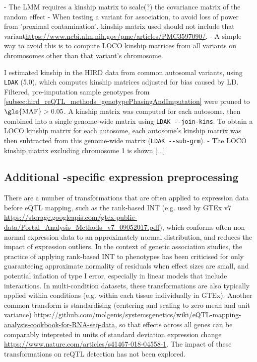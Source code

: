 - The LMM requires a kinship matrix to scale(?) the covariance matrix of the random effect
- When testing a variant for association, to avoid loss of power from 'proximal contamination', kinship matrix used should not include that variant\url{https://www.ncbi.nlm.nih.gov/pmc/articles/PMC3597090/}.
- A simple way to avoid this is to compute \gls{LOCO} kinship matrices from all variants on chromosomes other than that variant's chromosome\autocite{lippert2011FaSTLinearMixed}.

I estimated kinship in the \gls{HIRD} data from common autosomal variants, using \texttt{LDAK} (5.0), which computes kinship matrices adjusted for bias caused by \gls{LD}\autocite{speed2012ImprovedHeritabilityEstimation}.
Filtered, pre-imputation sample genotypes from \autoref{subsec:hird_reQTL_methods_genotypePhasingAndImputation} were pruned to $\text{\gls{MAF}} > 0.05$.
A kinship matrix was computed for each autosome, then combined into a single genome-wide matrix using \texttt{LDAK -{}-join-kins}.
To obtain a \gls{LOCO} kinship matrix for each autosome, each autosome's kinship matrix was then subtracted from this genome-wide matrix (\texttt{LDAK -{}-sub-grm}).
- The \gls{LOCO} kinship matrix excluding chromosome 1 is shown [...]



\subsection{Additional -specific expression preprocessing}

There are a number of transformations that are often applied to expression data before \gls{eQTL} mapping, 
such as the rank-based \gls{INT} (e.g. used by GTEx v7 \url{https://storage.googleapis.com/gtex-public-data/Portal_Analysis_Methods_v7_09052017.pdf}),
which conforms often non-normal expression data to an approximately normal distribution, and reduces the impact of expression outliers.
In the context of genetic association studies, the practice of applying rank-based \gls{INT} to phenotypes has been criticised for only guaranteeing approximate normality of residuals when effect sizes are small,
and potential inflation of type I error, especially in linear models that include interactions\autocite{beasley2009RankBasedInverseNormal}.
In multi-condition datasets, these transformations are also typically applied within conditions (e.g. within each tissue individually in GTEx).
Another common transform is standardising (centering and scaling to zero mean and unit variance) \url{https://github.com/molgenis/systemsgenetics/wiki/eQTL-mapping-analysis-cookbook-for-RNA-seq-data},
so that effects across all genes can be comparably intepreted in units of standard deviation expression change \url{https://www.nature.com/articles/s41467-018-04558-1}.
The impact of these transformations on \gls{reQTL} detection has not been explored.

